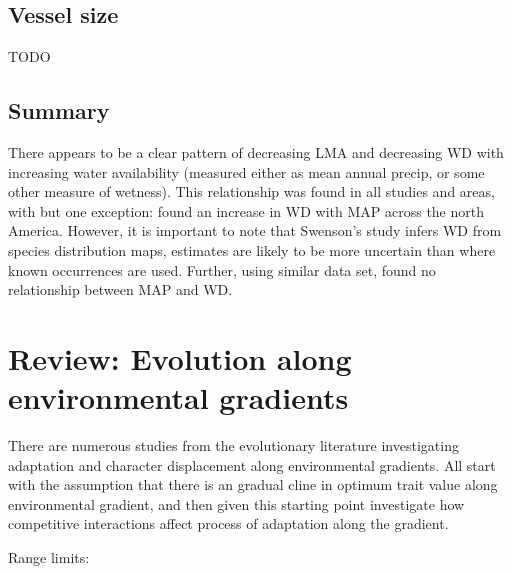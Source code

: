 \documentclass[a4paper,11pt]{article}
\begin{document}
\subsection{Vessel size}

TODO

\subsection{Summary}

There appears to be a clear pattern of decreasing LMA and decreasing WD with increasing water availability (measured either as mean annual precip, or some other measure of wetness). This relationship was found in all studies and areas, with but one exception: \citet{Swenson-2010} found an increase in WD with MAP across the north America. However, it is important to note that Swenson's study infers WD from species distribution maps, estimates are likely to be more uncertain than where known occurrences are used. Further, using similar data set, \citet{Stahl-2015} found no relationship between MAP and WD.


\section{Review: Evolution along environmental gradients}

There are numerous studies from the evolutionary literature investigating adaptation and character displacement along environmental gradients. All start with the assumption that there is an gradual cline in optimum trait value along environmental gradient, and then given this starting point investigate how competitive interactions affect process of adaptation along the gradient.

Range limits:
\end{document}
